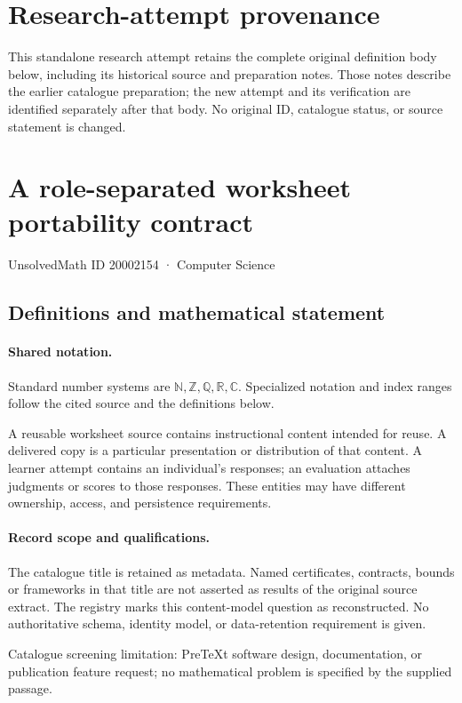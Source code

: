 \documentclass[11pt]{article}
\begin{document}
\section*{Research-attempt provenance}
This standalone research attempt retains the complete original definition body below,
including its historical source and preparation notes. Those notes describe the
earlier catalogue preparation; the new attempt and its verification are identified
separately after that body. No original ID, catalogue status, or source statement is changed.

\section{A role-separated worksheet portability contract}\label{20002154}
{\small UnsolvedMath ID 20002154 · Computer Science}
\subsection{Definitions and mathematical statement}

\paragraph{Shared notation.}Standard number systems are $\mathbb N,\mathbb Z,\mathbb Q,\mathbb R,\mathbb C$. Specialized notation and index ranges follow the cited source and the definitions below.


A reusable worksheet source contains instructional content intended for reuse. A delivered copy is a particular presentation or distribution of that content. A learner attempt contains an individual's responses; an evaluation attaches judgments or scores to those responses. These entities may have different ownership, access, and persistence requirements.
\paragraph{Record scope and qualifications.}
The catalogue title is retained as metadata. Named certificates, contracts, bounds or frameworks in that title are not asserted as results of the original source extract.
The registry marks this content-model question as reconstructed. No authoritative schema, identity model, or data-retention requirement is given.

Catalogue screening limitation: PreTeXt software design, documentation, or publication feature request; no mathematical problem is specified by the supplied passage.
\end{document}
